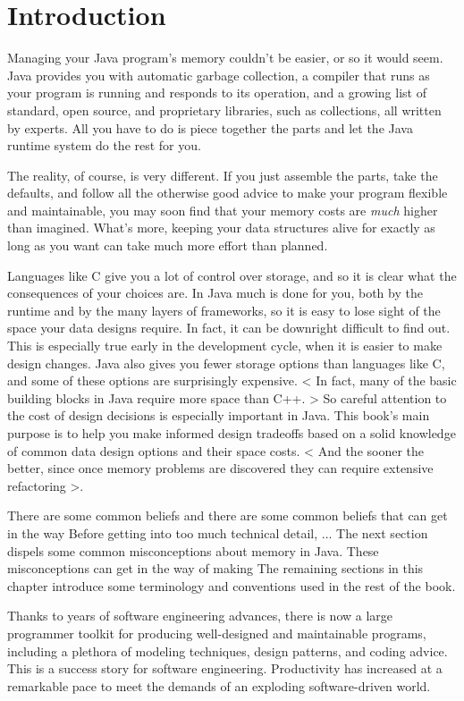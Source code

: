 
\chapter{Introduction}

Managing your Java program's memory couldn't be easier, or so it would
seem. Java provides you with automatic garbage collection, a compiler that
runs as your program is running and responds to its operation, and a growing list of standard, open source, and proprietary libraries, such as collections, all written by experts. All you have to do is piece together the parts and let the Java runtime system do the rest for you.

The reality, of course, is very different. If you just assemble the parts, take
the defaults, and follow all the otherwise good advice to make your
program flexible and maintainable, you may soon find that your memory costs are
\emph{much} higher than imagined.  What's more, keeping your data structures alive for exactly as long as you want can take much more effort than planned.

Languages like C give you a lot of control over storage, and so it is clear what
the consequences of your choices are. In Java much is done for you, both by the runtime and by the many layers of frameworks, so it is easy to lose sight of the space your data designs require. In fact, it can be downright difficult to find out. This is especially true early in the development cycle, when it is easier to make design changes.  Java also gives you fewer storage options than languages like C, and some of these options are surprisingly expensive. < In fact, many of the basic building blocks in Java require more space than C++. > So careful attention to the cost of design decisions is especially important in Java.  This book's main purpose is to help you make informed design tradeoffs based on a solid knowledge of common data design options and their space costs.  < And the sooner the better, since once memory problems are discovered they can require extensive
refactoring >. 

There are some common beliefs and there are some common beliefs that can get in the way 
Before getting into too much technical detail, ... The next section dispels some common misconceptions about memory in Java.  These misconceptions can get in the way of making  The remaining sections in this chapter introduce some terminology and conventions used in the rest of the book.

Thanks to years of software engineering advances, there is now a large
programmer toolkit for producing well-designed and maintainable programs,
including a plethora of modeling techniques, design patterns, and coding 
advice. This is a success story for software engineering. Productivity has
increased at a remarkable pace to meet the demands of an exploding software-driven world. 

